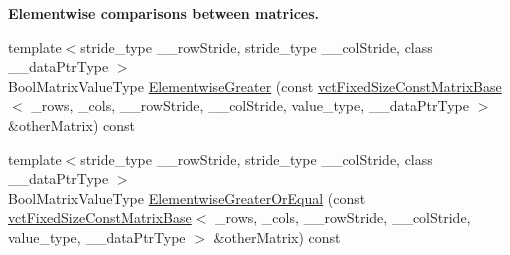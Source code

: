 \begin{Indent}{\bf Elementwise comparisons between matrices.}
\begin{DoxyCompactItemize}
\item 
{\footnotesize template$<$stride\-\_\-type \-\_\-\-\_\-row\-Stride, stride\-\_\-type \-\_\-\-\_\-col\-Stride, class \-\_\-\-\_\-data\-Ptr\-Type $>$ }\\Bool\-Matrix\-Value\-Type \hyperlink{classvct_fixed_size_const_matrix_base_a5deb3a5e417116dd88e9768d082c59e7}{Elementwise\-Greater} (const \hyperlink{classvct_fixed_size_const_matrix_base}{vct\-Fixed\-Size\-Const\-Matrix\-Base}$<$ \-\_\-rows, \-\_\-cols, \-\_\-\-\_\-row\-Stride, \-\_\-\-\_\-col\-Stride, value\-\_\-type, \-\_\-\-\_\-data\-Ptr\-Type $>$ \&other\-Matrix) const 
\item 
{\footnotesize template$<$stride\-\_\-type \-\_\-\-\_\-row\-Stride, stride\-\_\-type \-\_\-\-\_\-col\-Stride, class \-\_\-\-\_\-data\-Ptr\-Type $>$ }\\Bool\-Matrix\-Value\-Type \hyperlink{classvct_fixed_size_const_matrix_base_a09ef2795a922534541e59ad6ef877c13}{Elementwise\-Greater\-Or\-Equal} (const \hyperlink{classvct_fixed_size_const_matrix_base}{vct\-Fixed\-Size\-Const\-Matrix\-Base}$<$ \-\_\-rows, \-\_\-cols, \-\_\-\-\_\-row\-Stride, \-\_\-\-\_\-col\-Stride, value\-\_\-type, \-\_\-\-\_\-data\-Ptr\-Type $>$ \&other\-Matrix) const 
\end{DoxyCompactItemize}
\end{Indent}
